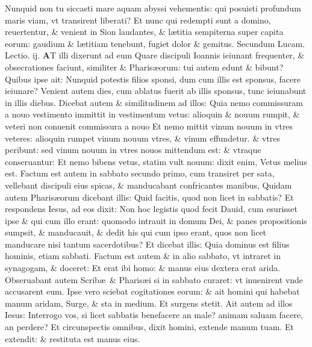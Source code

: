 \documentclass[a5paper,10pt]{book}
\def\leftmarginnote{%
	\lrmarginnote{\hskip -\marginparsep \hskip -6.5em}}
\def\rightmarginnote{%
	\lrmarginnote{\hskip\columnwidth \hskip -1em}}
\def\ae{æ}
\begin{document}
\begin{multicols*}{2}
Nunquid non tu siccasti mare aquam abyssi vehementis: qui posuisti profundum maris viam, vt transirent liberati?
Et nunc qui redempti sunt a domino, reuertentur, \& venient in Sion laudantes, \& l\ae titia sempiterna super capita eorum: gaudium \& l\ae titiam tenebunt, fugiet dolor \& gemitus.
\fancyhead[C]{\color{red} Feria. vj. Dominic\ae . ij. aduentus}
\newline \color{red} Secundum Lucam. \hfill Lectio. ij. \color{black}
\vspace{-.25em}
\lettrine[lines=2]{\bfseries \color{red} A}{}T illi\leftmarginnote{\begin{flushright}ca. 5.\end{flushright}} dixerunt ad eum Quare discipuli Ioannis ieiunant frequenter, \& obsecrationes faciunt, similiter \& Pharis\ae orum: tui autem edunt \& bibunt?
Quibus ipse ait: Nunquid potestis filios sponsi, dum cum illis est sponsus, facere ieiunare?
Venient autem dies, cum ablatus fuerit ab illis sponsus, tunc ieiunabunt in illis diebus.
Dicebat autem \& similitudinem ad illos: Quia nemo commissuram a nouo vestimento immittit in vestimentum vetus: alioquin \& nouum rumpit, \& veteri non conuenit commissura a nouo Et nemo mittit vinum nouum in vtres veteres: alioquin rumpet vinum nouum vtres, \& vinum effundetur. \& vtres peribunt: sed vinum nouum in vtres nouos mittendum est: \& vtraque conseruantur: Et nemo bibens vetus, statim vult nouum: dixit enim, Vetus melius est.\rightmarginnote{ca. 6.}
Factum est autem in sabbato secundo primo, cum transiret per sata, vellebant
discipuli eius spicas, \& manducabant confricantes manibus, Quidam autem Pharis\ae orum dicebant illis: Quid facitis, quod non licet in sabbatis? Et respondens Iesus, ad eos dixit: Non hoc legistis quod fecit Dauid, cum esurisset ipse \& qui cum illo erant: quomodo intrauit in domum Dei, \& panes propositionis sumpsit, \& manducauit, \& dedit his qui cum ipso erant, quos non licet manducare nisi tantum sacerdotibus?
Et dicebat illis: Quia dominus est filius hominis, etiam sabbati.
Factum est autem \& in alio sabbato, vt intraret in synagogam, \& doceret: Et erat ibi homo: \& manus eius dextera erat arida.
Obseruabant autem Scrib\ae \ \& Pharis\ae i si in sabbato curaret: vt inuenirent vnde accusarent eum.
Ipse vero sciebat cogitationes eorum: \& ait homini qui habebat manum aridam, Surge, \& sta in medium.
Et surgens stetit. Ait autem ad illos Iesus: Interrogo vos, si licet sabbatis benefacere an male? animam saluam facere, an perdere?
Et circunspectis omnibus, dixit homini, extende manum tuam.
Et extendit: \& restituta est manus eius.

\end{multicols*}
\end{document}
